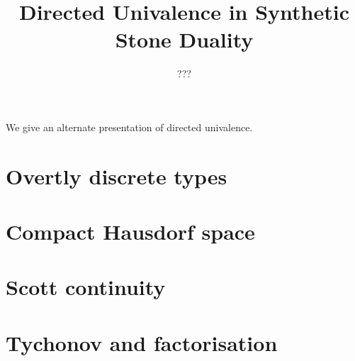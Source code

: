 \documentclass{../util/zariski}
\title{Directed Univalence in Synthetic Stone Duality}
\begin{document}
\author{???}

\maketitle

We give an alternate presentation of directed univalence.


\tableofcontents

\section{Overtly discrete types}


\section{Compact Hausdorf space}


\section{Scott continuity}
%

\section{Tychonov and factorisation}
%

\printbibliography
\end{document}
